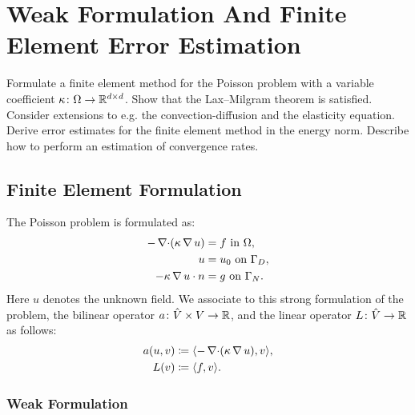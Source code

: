 
\chapter[Poisson Equation]{Weak Formulation And Finite Element Error Estimation}

\begin{problem_text}
    Formulate a finite element method for the Poisson problem with a variable
    coefficient \( \kappa \colon \Omega \to \mathbb{R}^{d\times d}\). Show that the
    Lax--Milgram theorem is satisfied. Consider extensions to e.g. the
    convection-diffusion and the elasticity equation. Derive 
    error estimates for the finite element method in the energy norm. Describe
    how to perform an estimation of convergence rates.
\end{problem_text}

\section{Finite Element Formulation}

The Poisson problem is formulated as:
\begin{align}
    -\operatorname{\mathop{}\!\nabla \cdot} (\kappa \operatorname{\mathop{}\!\nabla} u) &= f \text { in } \Omega,\\
    u &= u_0 \text{ on } \Gamma_D,\\
    -\kappa \operatorname{\mathop{}\!\nabla} u \cdot n &= g \text{ on } \Gamma_N.
\end{align}
Here \( u \) denotes the unknown field. We associate to this strong formulation
of the problem, the bilinear operator \( a\colon \hat{V} \times V \to \mathbb{R}\),
and the linear operator \( L \colon \hat{V} \to \mathbb{R}\) as follows:
\begin{align}
    a(u, v) &\coloneqq \langle -\operatorname{\mathop{}\!\nabla \cdot}(\kappa \operatorname{\mathop{}\!\nabla} u), v \rangle, \\
    L(v) &\coloneqq \langle f, v \rangle.
\end{align}

\subsection{Weak Formulation}
\label{sub:weak_formulation}

